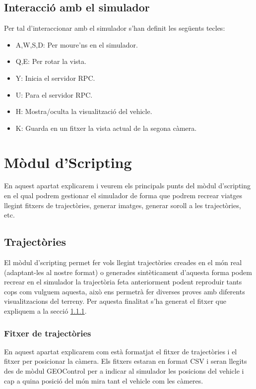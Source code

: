 \documentclass[10pt,a4paper,twocolumn,twoside]{article}
\begin{document}
\subsection{Interacció amb el simulador}
Per tal d'interaccionar amb el simulador s'han definit les següents tecles:

\begin{itemize}
\item A,W,S,D: Per moure'ns en el simulador.
\item Q,E: Per rotar la vista.
\item Y: Inicia el servidor RPC.
\item U: Para el servidor RPC.
\item H: Mostra/oculta la visualització del vehicle.
\item K: Guarda en un fitxer la vista actual de la segona càmera.
\end{itemize}

\section{Mòdul d'Scripting}
En aquest apartat explicarem i veurem els principals punts del mòdul d'scripting en el qual podrem gestionar el simulador de forma que podrem recrear viatges llegint fitxers de trajectòries, generar imatges, generar soroll a les trajectòries, etc.

\subsection{Trajectòries}
El mòdul d'scripting permet fer vols llegint trajectòries creades en el món real (adaptant-les al nostre format) o generades sintèticament d'aquesta forma podem recrear en el simulador la trajectòria feta anteriorment podent reproduir tants cops com vulguem aquesta, això ens permetrà fer diverses proves amb diferents visualitzacions del terreny. Per aquesta finalitat s'ha generat el fitxer que expliquem a la secció \ref{file-trajectories}.

\subsubsection{Fitxer de trajectòries}
\label{file-trajectories}
En aquest apartat explicarem com està formatjat el fitxer de trajectòries i el fitxer per posicionar la càmera. Els fitxers estaran en format CSV i seran llegits des de mòdul GEOControl per a indicar al simulador les posicions del vehicle i cap a quina posició del món mira tant el vehicle com les càmeres.
\end{document}
